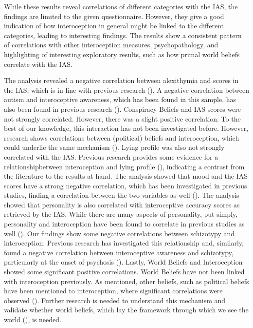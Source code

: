 \documentclass[
  man,
  floatsintext,
  longtable,
  nolmodern,
  notxfonts,
  notimes,
  colorlinks=true,linkcolor=blue,citecolor=blue,urlcolor=blue]{apa7}
\begin{document}
While these results reveal correlations of different categories with the
IAS, the findings are limited to the given questionnaire. However, they
give a good indication of how interoception in general might be linked
to the different categories, leading to interesting findings. The
results show a consistent pattern of correlations with other
interoception measures, psychopathology, and highlighting of interesting
exploratory results, such as how primal world beliefs correlate with the
IAS.

The analysis revealed a negative correlation between alexithymia and
scores in the IAS, which is in line with previous research
(). A negative
correlation between autism and interoceptive awareness, which has been
found in this sample, has also been found in previous research
(). Conspiracy Beliefs and
IAS scores were not strongly correlated. However, there was a slight
positive correlation. To the best of our knowledge, this interaction has
not been investigated before. However, research shows correlations
between (political) beliefs and interoception, which could underlie the
same mechanism (). Lying
profile was also not strongly correlated with the IAS. Previous research
provides some evidence for a relationshipbetween interoception and lying
profile (),
indicating a contrast from the literature to the results at hand. The
analysis showed that mood and the IAS scores have a strong negative
correlation, which has been investigated in previous studies, finding a
correlation between the two variables as well
(). The
analysis showed that personality is also correlated with interoceptive
accuracy scores as retrieved by the IAS. While there are many aspects of
personality, put simply, personality and interoception have been found
to correlate in previous studies as well (). Our findings show some negative correlations between
schizotypy and interoception. Previous research has investigated this
relationship and, similarly, found a negative correlation between
interoceptive awareness and schizotypy, particularly at the onset of
psychosis ().
Lastly, World Beliefs and Interoception showed some significant positive
correlations. World Beliefs have not been linked with interoception
previously. As mentioned, other beliefs, such as political beliefs have
been mentioned to interoception, where significant correlations were
observed (). Further
research is needed to understand this mechanism and validate whether
world beliefs, which lay the framework through which we see the world
(), is needed.
\end{document}
